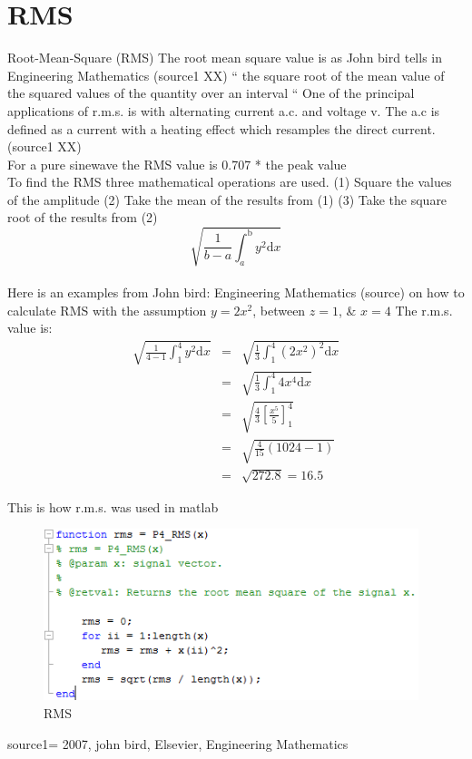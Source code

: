 \section{RMS}

Root-Mean-Square (RMS)
The root mean square value is as John bird tells in Engineering Mathematics (source1 XX) “ the square root of the mean value of the squared values of the quantity over an interval “
One of the principal applications of r.m.s. is with alternating current a.c. and voltage v. The a.c is defined as a current with a heating effect which resamples the direct current. (source1 XX)
\\
For a pure sinewave the RMS value is 0.707 * the peak value
\\
To find the RMS three mathematical operations are used.
(1)	Square the values of the amplitude
(2)	Take the mean of the results from (1)
(3)	Take the square root of the results from (2)
\begin{equation}\label{eq:RMS formular}
\sqrt{\frac{1}{b-a} \int_a^\mathrm{b}y^2\mathrm{d}x}
\end{equation}
\\
Here is an examples from John bird: Engineering Mathematics (source) on how to calculate RMS with the assumption $y = 2x^2$, between $z = 1$, \& $x = 4$
The r.m.s. value is:
\\
\begin{equation}\label{eq:RMS formular}
\begin{array}{rcl}
  \sqrt{\frac{1}{4-1} \int_1^\mathrm{4}y^2\mathrm{d}x}
  & = & \sqrt{\frac{1}{3} \int_1^\mathrm{4}(2x^2)^2\mathrm{d}x}\\
  & = & \sqrt{\frac{1}{3} \int_1^\mathrm{4}4x^4\mathrm{d}x}\\
  & = & \sqrt{\frac{4}{3} [\frac{x^5}{5}]_1^4}\\
  & = & \sqrt{\frac{4}{15} (1024-1)}\\
  & = & \sqrt{272.8} = 16.5
\end{array}
\end{equation}

This is how r.m.s. was used in matlab
\begin{figure}
\begin{center}
\includegraphics[height=5cm]{fig/RMS_matlabCode.png}
\caption{RMS}
\end{center}
\end{figure}

source1= 2007, john bird, Elsevier, Engineering Mathematics